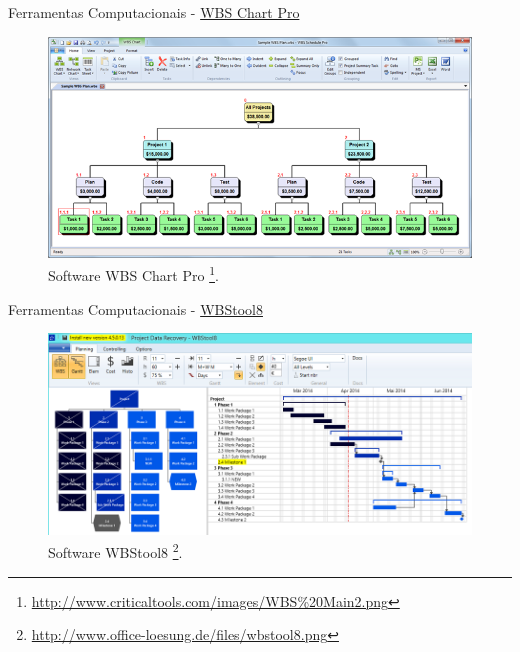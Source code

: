 \documentclass[xcolor=dvipsnames]{beamer}
\begin{document}
\begin{frame}{Ferramentas Computacionais - \href{http://www.criticaltools.com/WBSChartPro.html}{WBS Chart Pro}}

	\begin{figure}[H]
    
     	\centering
        \label{fig:taskarchitect}
        \includegraphics[width=0.9\linewidth]{img/wbs_schedule.png}
        \caption{Software WBS Chart Pro \footnote{\url{http://www.criticaltools.com/images/WBS\%20Main2.png}}.}
        
	\end{figure}
    
\end{frame}



\begin{frame}{Ferramentas Computacionais - \href{http://www.wbstool8.com/en/Start.aspx}{WBStool8}}

	\begin{figure}[H]
    
     	\centering
        \label{fig:taskarchitect}
        \includegraphics[width=0.9\linewidth]{img/wbstool8.png}
        \caption{Software WBStool8 \footnote{\url{http://www.office-loesung.de/files/wbstool8.png}}.}
        
	\end{figure}
    
\end{frame}
\end{document}
